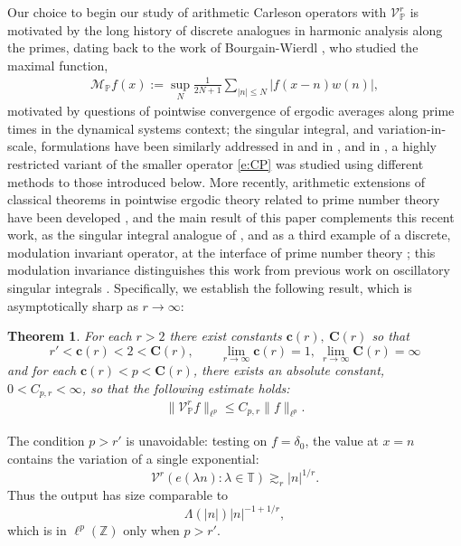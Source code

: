 \documentclass[12pt]{amsart}
\numberwithin{equation}{section}
\newtheorem{theorem}{Theorem}[section]
\theoremstyle{definition}
\begin{document}
Our choice to begin our study of arithmetic Carleson operators with $\mathcal{V}^r_{\mathbb{P}}$ is motivated by the long history of discrete analogues in harmonic analysis along the primes, dating back to the work of Bourgain-Wierdl \cite{Bp, Wierdl}, who studied the maximal function,
\begin{align}\label{e:maxprime}
    \mathcal{M}_{\mathbb{P}} f(x) := \sup_N \frac{1}{2N+1} \sum_{|n| \leq N} |f(x-n) w(n)|,
\end{align}
motivated by questions of pointwise convergence of ergodic averages along prime times in the dynamical systems context; the singular integral, and variation-in-scale, formulations have been similarly addressed in \cite{MT} and in \cite{MTZK}, and in \cite{CHKLP}, a highly restricted variant of the smaller operator \eqref{e:CP} was studied using different methods to those introduced below. More recently, arithmetic extensions of classical theorems in pointwise ergodic theory related to prime number theory have been developed \cite{F+,FKT1,FKT2}, and the main result of this paper complements this recent work, as the singular integral analogue of \cite{F+}, and as a third example of a discrete, modulation invariant operator, at the interface of prime number theory \cite{FKT1,FKT2}; this modulation invariance distinguishes this work from previous work on oscillatory singular integrals \cite{BKSW,KR1,KR2}. Specifically, we establish the following result, which is asymptotically sharp as $r \to \infty$:

\begin{theorem}\label{t:main}
For each $r > 2$ there exist constants $\mathbf{c}(r), \ \mathbf{C}(r)$ so that
\[ r' < \mathbf{c}(r) < 2 < \mathbf{C}(r), \qquad \lim_{r \to \infty} \mathbf{c}(r) = 1, \ \lim_{r \to \infty} \mathbf{C}(r) = \infty \]
and for each $\mathbf{c}(r) < p < \mathbf{C}(r)$, there exists an absolute constant, $0 < C_{p,r} < \infty$, so that the following estimate holds:
\begin{align}
    \| \mathcal{V}^r_{\mathbb{P}} f \|_{\ell^p} \leq C_{p,r} \| f\|_{\ell^p}.
\end{align}
\end{theorem}

The condition \(p>r'\) is unavoidable: testing on \(f=\delta_0\), the value
at \(x=n\) contains the variation of a single exponential:
\[
    \mathcal{V}^r(e(\lambda n):\lambda\in\mathbb T)\gtrsim_r |n|^{1/r}.
\]
Thus the output has size comparable to
\[
    \Lambda(|n|)|n|^{-1+1/r},
\]
which is in \(\ell^p(\mathbb Z)\) only when \(p>r'\).
\end{document}
